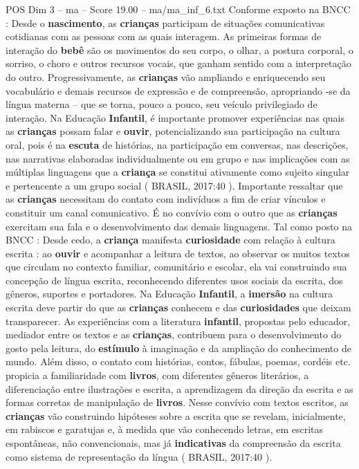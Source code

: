 \begin{textsample}{POS Dim 3 – ma – Score 19.00 – ma/ma\_inf\_6.txt}
Conforme exposto na BNCC : Desde o \textbf{nascimento}, as \textbf{crianças} participam de situações comunicativas cotidianas com as pessoas com as quais interagem.
As primeiras formas de interação do \textbf{bebê} são os movimentos do seu corpo, o olhar, a postura corporal, o sorriso, o choro e outros recursos vocais, que ganham sentido com a interpretação do outro.
Progressivamente, as \textbf{crianças} vão ampliando e enriquecendo seu vocabulário e demais recursos de expressão e de compreensão, apropriando -se da língua materna – que se torna, pouco a pouco, seu veículo privilegiado de interação.
Na Educação \textbf{Infantil}, é importante promover experiências nas quais as \textbf{crianças} possam falar e \textbf{ouvir}, potencializando sua participação na cultura oral, pois é na \textbf{escuta} de histórias, na participação em conversas, nas descrições, nas narrativas elaboradas individualmente ou em grupo e nas implicações com as múltiplas linguagens que a \textbf{criança} se constitui ativamente como sujeito singular e pertencente a um grupo social ( BRASIL, 2017:40 ).
Importante ressaltar que as \textbf{crianças} necessitam do contato com indivíduos a fim de criar vínculos e constituir um canal comunicativo.
É no convívio com o outro que as \textbf{crianças} exercitam sua fala e o desenvolvimento das demais linguagens.
Tal como posto na BNCC : Desde cedo, a \textbf{criança} manifesta \textbf{curiosidade} com relação à cultura escrita : ao \textbf{ouvir} e acompanhar a leitura de textos, ao observar os muitos textos que circulam no contexto familiar, comunitário e escolar, ela vai construindo sua concepção de língua escrita, reconhecendo diferentes usos sociais da escrita, dos gêneros, suportes e portadores.
Na Educação \textbf{Infantil}, a \textbf{imersão} na cultura escrita deve partir do que as \textbf{crianças} conhecem e das \textbf{curiosidades} que deixam transparecer.
As experiências com a literatura \textbf{infantil}, propostas pelo educador, mediador entre os textos e as \textbf{crianças}, contribuem para o desenvolvimento do gosto pela leitura, do \textbf{estímulo} à imaginação e da ampliação do conhecimento de mundo.
Além disso, o contato com histórias, contos, fábulas, poemas, cordéis etc. propicia a familiaridade com \textbf{livros}, com diferentes gêneros literários, a diferenciação entre ilustrações e escrita, a aprendizagem da direção da escrita e as formas corretas de manipulação de \textbf{livros}.
Nesse convívio com textos escritos, as \textbf{crianças} vão construindo hipóteses sobre a escrita que se revelam, inicialmente, em rabiscos e garatujas e, à medida que vão conhecendo letras, em escritas espontâneas, não convencionais, mas já \textbf{indicativas} da compreensão da escrita como sistema de representação da língua ( BRASIL, 2017:40 ).

\end{textsample}
